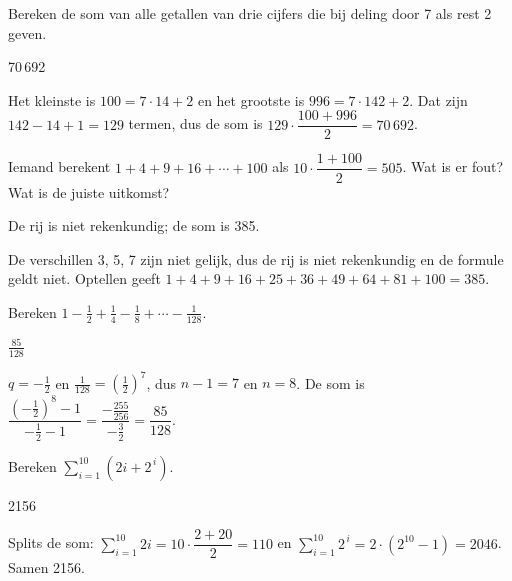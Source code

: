 \begin{oefeningen}
\begin{oefening}[2]
Bereken de som van alle getallen van drie cijfers die bij deling door 7 als rest 2 geven.
\begin{solution}
70\,692
\end{solution}
\begin{fullsolution}
Het kleinste is $100=7\cdot 14+2$ en het grootste is $996=7\cdot 142+2$. Dat zijn $142-14+1=129$ termen, dus de som is $129\cdot\dfrac{100+996}{2}=70\,692$.
\end{fullsolution}
\end{oefening}

\begin{oefening}[2]
Iemand berekent $1 + 4 + 9 + 16 + \cdots + 100$ als $10 \cdot \dfrac{1 + 100}{2} = 505$. Wat is er fout? Wat is de juiste uitkomst?
\begin{solution}
De rij is niet rekenkundig; de som is 385.
\end{solution}
\begin{fullsolution}
De verschillen 3, 5, 7 zijn niet gelijk, dus de rij is niet rekenkundig en de formule geldt niet. Optellen geeft $1+4+9+16+25+36+49+64+81+100=385$.
\end{fullsolution}
\end{oefening}

\begin{oefening}[2]
Bereken $1 - \tfrac12 + \tfrac14 - \tfrac18 + \cdots - \tfrac{1}{128}$.
\begin{solution}
$\tfrac{85}{128}$
\end{solution}
\begin{fullsolution}
$q=-\tfrac12$ en $\tfrac{1}{128}=(\tfrac12)^7$, dus $n-1=7$ en $n=8$. De som is $\dfrac{(-\tfrac12)^8-1}{-\tfrac12-1}=\dfrac{-\tfrac{255}{256}}{-\tfrac32}=\dfrac{85}{128}$.
\end{fullsolution}
\end{oefening}

\begin{oefening}[2]
Bereken $\displaystyle\sum_{i=1}^{10} \left(2i + 2^{\,i}\right)$.
\begin{solution}
2156
\end{solution}
\begin{fullsolution}
Splits de som: $\displaystyle\sum_{i=1}^{10} 2i=10\cdot\dfrac{2+20}{2}=110$ en $\displaystyle\sum_{i=1}^{10} 2^{\,i}=2\cdot(2^{10}-1)=2046$. Samen 2156.
\end{fullsolution}
\end{oefening}


\end{oefeningen}
